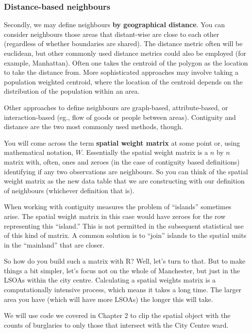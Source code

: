 \documentclass[
  krantz2]{krantz}
\begin{document}
\hypertarget{distance-based-neighbours}{%
\subsubsection{Distance-based neighbours}\label{distance-based-neighbours}}

Secondly, we may define neighbours \textbf{by geographical distance}. You can consider neighbours those areas that distant-wise are close to each other (regardless of whether boundaries are shared). The distance metric often will be euclidean, but other commonly used distance metrics could also be employed (for example, Manhattan). Often one takes the centroid of the polygon as the location to take the distance from. More sophisticated approaches may involve taking a population weighted centroid, where the location of the centroid depends on the distribution of the population within an area.

Other approaches to define neighbours are graph-based, attribute-based, or interaction-based (eg., flow of goods or people between areas). Contiguity and distance are the two most commonly used methods, though.

You will come across the term \textbf{spatial weight matrix} at some point or, using mathematical notation, \(W\). Essentially the spatial weight matrix is a \(n\) by \(n\) matrix with, often, ones and zeroes (in the case of contiguity based definitions) identifying if any two observations are neighbours. So you can think of the spatial weight matrix as the new data table that we are constructing with our definition of neighbours (whichever definition that is).

When working with contiguity measures the problem of ``islands'' sometimes arise. The spatial weight matrix in this case would have zeroes for the row representing this ``island.'' This is not permitted in the subsequent statistical use of this kind of matrix. A common solution is to ``join'' islands to the spatial units in the ``mainland'' that are closer.

So how do you build such a matrix with R? Well, let's turn to that. But to make things a bit simpler, let's focus not on the whole of Manchester, but just in the LSOAs within the city centre. Calculating a spatial weights matrix is a computationally intensive process, which means it takes a long time. The larger area you have (which will have more LSOAs) the longer this will take.

We will use code we covered in Chapter 2 to clip the spatial object with the counts of burglaries to only those that intersect with the City Centre ward.
\end{document}
